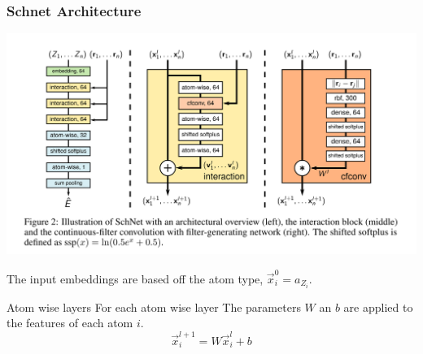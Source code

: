 \documentclass{beamer}
\begin{document}
\begin{frame}
  \frametitle{Schnet Architecture}
  \begin{center}
    \includegraphics[width=0.5\linewidth]{./archetecture_overview.png}
  \end{center}
  The input embeddings are based off the atom type, $\vec{x}^0_i = a_{Z_i}$.
  \begin{block}{Atom wise layers}
    For each atom wise layer The parameters $W$ an $b$ are applied to the features of each atom $i$.
    $$\vec{x}_i^{l+1} = W\vec{x}_i^l + b$$
  \end{block}
\end{frame}
\end{document}
